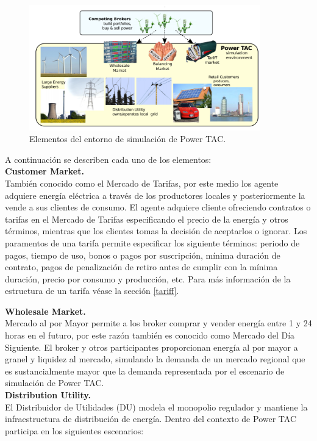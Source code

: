 \begin{figure}[!h]
	\centering
	\includegraphics[width=10cm]{img/entorno.png}
	\caption{Elementos del entorno de simulación de Power TAC.}
	\label{entorno}
\end{figure}

A continuación se describen cada uno de los elementos:\\

\textbf{Customer Market.}\\

También conocido como el  Mercado de Tarifas, por este medio los agente adquiere energía eléctrica a través de los productores locales y posteriormente la vende a sus clientes de consumo. El agente adquiere cliente ofreciendo contratos o tarifas en el Mercado de Tarifas especificando el precio de la energía y otros términos, mientras que los clientes tomas la decisión de aceptarlos o ignorar. Los paramentos de una tarifa permite especificar los siguiente términos: periodo de pagos, tiempo de uso, bonos o pagos por suscripción, mínima duración de contrato, pagos de penalización de retiro antes de cumplir con la mínima duración, precio por consumo y producción, etc. Para más información  de la estructura de un tarifa véase la sección \ref{tariff}.

\textbf{Wholesale Market.}\\

Mercado al por Mayor permite a los broker comprar y vender energía entre 1 y 24 horas en el futuro, por este razón también es conocido como Mercado del Día Siguiente. El broker y otros participantes proporcionan energía al por mayor a granel y liquidez al mercado, simulando la demanda de un mercado regional que es sustancialmente mayor que la demanda representada por el escenario de simulación de Power TAC.\\

\textbf{Distribution Utility.}\\

El Distribuidor de Utilidades (DU) modela el monopolio regulador y mantiene la infraestructura de distribución de energía. Dentro del contexto de Power TAC participa en los siguientes escenarios:

